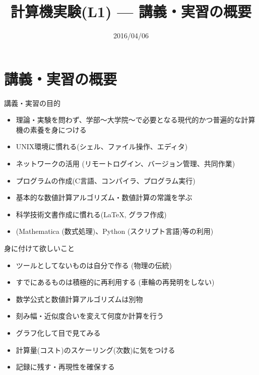 \documentclass[dvipdfmx]{beamer}
\title{計算機実験(L1) --- 講義・実習の概要}
\date{2016/04/06}
\begin{document}
\begin{frame}
  \titlepage
  \tableofcontents
\end{frame}

\section{講義・実習の概要}

\begin{frame}[t]{講義・実習の目的}
  \begin{itemize}
  \item 理論・実験を問わず、学部〜大学院〜で必要となる現代的かつ普遍的な計算機の素養を身につける
  \item UNIX環境に慣れる(シェル、ファイル操作、エディタ)
  \item ネットワークの活用 (リモートログイン、バージョン管理、共同作業)
  \item プログラムの作成(C言語、コンパイラ、プログラム実行)
  \item 基本的な数値計算アルゴリズム・数値計算の常識を学ぶ
  \item 科学技術文書作成に慣れる(\LaTeX, グラフ作成)
  \item (Mathematica (数式処理)、Python (スクリプト言語)等の利用)
  \end{itemize}
\end{frame}

\begin{frame}[t]{身に付けて欲しいこと}
  \begin{itemize}
  \item ツールとしてないものは自分で作る (物理の伝統)
  \item すでにあるものは積極的に再利用する (車輪の再発明をしない)
  \item 数学公式と数値計算アルゴリズムは別物
  \item 刻み幅・近似度合いを変えて何度か計算を行う
  \item グラフ化して目で見てみる
  \item 計算量(コスト)のスケーリング(次数)に気をつける
  \item 記録に残す・再現性を確保する
  \end{itemize}
\end{frame}
\end{document}
